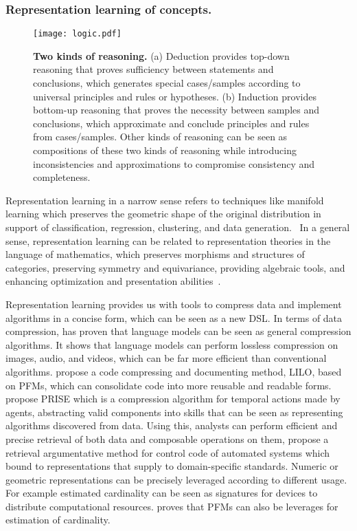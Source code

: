   
\subsubsection{Representation learning of concepts.} \label{sec:representation}
  
\begin{figure*}[h]
    \centering
    \texttt{[image: logic.pdf]} %
    \caption{\textbf{Two kinds of reasoning.} (a) Deduction provides top-down reasoning that proves sufficiency between statements and conclusions, which generates special cases/samples according to universal principles and rules or hypotheses. (b) Induction provides bottom-up reasoning that proves the necessity between samples and conclusions, which approximate and conclude principles and rules from cases/samples. Other kinds of reasoning can be seen as compositions of these two kinds of reasoning while introducing inconsistencies and approximations to compromise consistency and completeness.}
    \label{fig:logic}
\end{figure*}
  
Representation learning in a narrow sense refers to techniques like manifold learning which preserves the geometric shape of the original distribution in support of classification, regression, clustering, and data generation.~\cite{buchholzrobustness, feyposition} In a general sense, representation learning can be related to representation theories in the language of mathematics, which preserves morphisms and structures of categories, preserving symmetry and equivariance, providing algebraic tools, and enhancing optimization and presentation abilities~\cite{yuan2023power, blaauwbroekgraph2tac, HansenCF24}. 
  
Representation learning provides us with tools to compress data and implement algorithms in a concise form, which can be seen as a new DSL. In terms of data compression, \cite{DeletangRDCGMGW24} has proven that language models can be seen as general compression algorithms. It shows that language models can perform lossless compression on images, audio, and videos, which can be far more efficient than conventional algorithms. \cite{GrandWBOLTA24} propose a code compressing and documenting method, LILO, based on PFMs, which can consolidate code into more reusable and readable forms. \cite{zhengprise} propose PRISE which is a compression algorithm for temporal actions made by agents, abstracting valid components into skills that can be seen as representing algorithms discovered from data. Using this, analysts can perform efficient and precise retrieval of both data and composable operations on them, \cite{KoziolekGHALE24} propose a retrieval argumentative method for control code of automated systems which bound to representations that supply to domain-specific standards. Numeric or geometric representations can be precisely leveraged according to different usage. For example estimated cardinality can be seen as signatures for devices to distribute computational resources. \cite{FMcard} proves that PFMs can also be leverages for estimation of cardinality.
  
